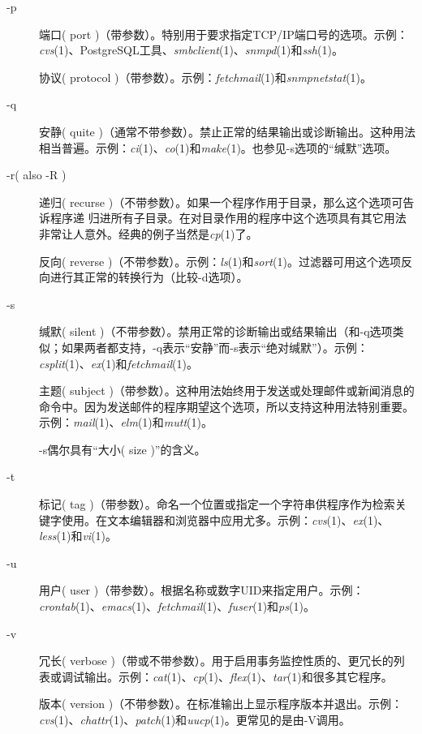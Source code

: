 \documentclass[12pt,oneside]{book}
\begin{document}
\begin{common-format}
\begin{description}
\item[-p] 端口( port )（带参数）。特别用于要求指定TCP/IP端口号的选项。示例：\textit{cvs}(1)、PostgreSQL工具、\textit{smbclient}(1)、\textit{snmpd}(1)和\textit{ssh}(1)。

协议( protocol )（带参数）。示例：\textit{fetchmail}(1)和\textit{snmpnetstat}(1)。

\item[-q] 安静( quite )（通常不带参数）。禁止正常的结果输出或诊断输出。这种用法相当普遍。示例：\textit{ci}(1)、\textit{co}(1)和\textit{make}(1)。也参见-s选项的“缄默”选项。

\item[-r( also -R )] 递归( recurse )（不带参数）。如果一个程序作用于目录，那么这个选项可告诉程序递
归进所有子目录。在对目录作用的程序中这个选项具有其它用法非常让人意外。经典的例子当然是\textit{cp}(1)了。

反向( reverse )（不带参数）。示例：\textit{ls}(1)和\textit{sort}(1)。过滤器可用这个选项反向进行其正常的转换行为（比较-d选项）。

\item[-s] 缄默( silent )（不带参数）。禁用正常的诊断输出或结果输出（和-q选项类似；如果两者都支持，-q表示“安静”而-s表示“绝对缄默”）。示例：\textit{csplit}(1)、\textit{ex}(1)和\textit{fetchmail}(1)。

主题( subject )（带参数）。这种用法始终用于发送或处理邮件或新闻消息的命令中。因为发送邮件的程序期望这个选项，所以支持这种用法特别重要。示例：\textit{mail}(1)、\textit{elm}(1)和\textit{mutt}(1)。

-s偶尔具有“大小( size )”的含义。

\item[-t] 标记( tag )（带参数）。命名一个位置或指定一个字符串供程序作为检索关键字使用。在文本编辑器和浏览器中应用尤多。示例：\textit{cvs}(1)、\textit{ex}(1)、\textit{less}(1)和\textit{vi}(1)。

\item[-u] 用户( user )（带参数）。根据名称或数字UID来指定用户。示例：\textit{crontab}(1)、\textit{emacs}(1)、\textit{fetchmail}(1)、\textit{fuser}(1)和\textit{ps}(1)。

\item[-v] 冗长( verbose )（带或不带参数）。用于启用事务监控性质的、更冗长的列表或调试输出。示例：\textit{cat}(1)、\textit{cp}(1)、\textit{flex}(1)、\textit{tar}(1)和很多其它程序。

版本( version )（不带参数）。在标准输出上显示程序版本并退出。示例：\textit{cvs}(1)、\textit{chattr}(1)、\textit{patch}(1)和\textit{uucp}(1)。更常见的是由-V调用。


\end{description}
\end{common-format}
\end{document}
